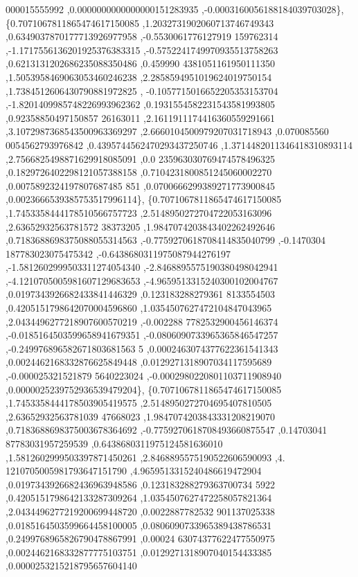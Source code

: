 \begin{DoxyCode}
      000015555992 ,0.0000000000000000151283935 ,-0.0003160056188184039703028\},
\{0.7071067811865474617150085 ,1.2032731902060713746749343 ,0.6349037870177713926977958 ,-0.5530061776127919
      159762314 ,-1.1717556136201925376383315 ,-0.5752241749970935513758263 ,0.6213131202686235088350486 ,0.459990
      4381051161950111350 ,1.5053958469063053460246238 ,2.2858594951019624019750154 ,1.7384512606430790881972825 ,
      -0.1057715016652205353153704 ,-1.8201409985748226993962362 ,0.1931554582231543581993805 ,0.92358850497150857
      26163011 ,2.1611911174416360559291661 ,3.1072987368543500963369297 ,2.6660104500979207031718943 ,0.070085560
      0054562793976842 ,0.4395744562470293437250746 ,1.3714482011346418310893114 ,2.7566825498871629918085091 ,0.0
      235963030769474578496325 ,0.1829726402298121057388158 ,0.7104231800851245060002270 ,0.0075892324197807687485
      851 ,0.0700666299389271773900845 ,0.0023666539385753517996114\},
\{0.7071067811865474617150085 ,1.7453358444178510566757723 ,2.5148950272704722053163096 ,2.63652932563781572
      38373205 ,1.9847074203843402262492646 ,0.7183688698375088055314563 ,-0.7759270618708414835040799 ,-0.1470304
      187783023075475342 ,-0.6438680311975087944276197 ,-1.5812602999503311274054340 ,-2.8468895575190380498042941
       ,-4.1210705005981607129683653 ,-4.9659513315240300102004767 ,0.0197343926682433841446329 ,0.123183288279361
      8133554503 ,0.4205151798642070004596860 ,1.0354507627472104847043965 ,2.0434496277218907600570219 ,-0.002288
      7782532900456146374 ,-0.0185164503599658941679351 ,-0.0806090733965365846547257 ,-0.249976896582671803681563
      5 ,0.0002463074377622361541343 ,0.0024462168332876625849448 ,0.0129271318907034117595689 ,-0.000025321521879
      5640223024 ,-0.0002980220801103711908940 ,0.0000025239752936539479204\},
\{0.7071067811865474617150085 ,1.7453358444178503905419575 ,2.5148950272704695407810505 ,2.63652932563781039
      47668023 ,1.9847074203843331208219070 ,0.7183688698375003678364692 ,-0.7759270618708493660875547 ,0.14703041
      87783031957259539 ,0.6438680311975124581636010 ,1.5812602999503397871450261 ,2.8468895575190522606590093 ,4.
      1210705005981793647151790 ,4.9659513315240486619472904 ,0.0197343926682436963948586 ,0.123183288279363700734
      5922 ,0.4205151798642133287309264 ,1.0354507627472258057821364 ,2.0434496277219200699448720 ,0.0022887782532
      901137025338 ,0.0185164503599664458100005 ,0.0806090733965389438786531 ,0.2499768965826790478867991 ,0.00024
      63074377622477550975 ,0.0024462168332877775103751 ,0.0129271318907040154433385 ,0.0000253215218795657604140 

\end{DoxyCode}

